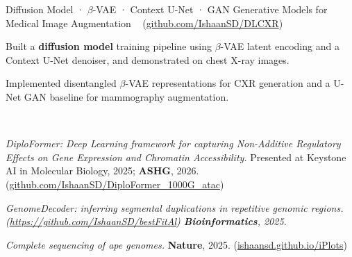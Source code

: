 \documentclass[11pt, a4paper]{awesome-cv}
\begin{document}
\begin{cventries}
  \cventry
    {Diffusion Model · $\beta$-VAE · Context U-Net · GAN}
    {Generative Models for Medical Image Augmentation}
    {~}
    {(\href{https://github.com/IshaanSD/DLCXR}{github.com/IshaanSD/DLCXR})}
    {
        \begin{cvitems}
            \item {Built a \textbf{diffusion model} training pipeline using $\beta$-VAE latent encoding and a Context U-Net denoiser, and demonstrated on chest X-ray images.}
            \item {Implemented disentangled $\beta$-VAE representations for CXR generation and a U-Net GAN baseline for mammography augmentation.}
        \end{cvitems}
    }
\end{cventries}

\begin{cventries}
\cventry
{~}{~}{~}{~}
{
\begin{cvitems}
\item {\textit{DiploFormer: Deep Learning framework for capturing Non-Additive Regulatory Effects on Gene Expression and Chromatin Accessibility.} Presented at Keystone AI in Molecular Biology, 2025; \textbf{ASHG}, 2026. (\href{https://github.com/IshaanSD/DiploFormer_1000G_atac}{github.com/IshaanSD/DiploFormer\_1000G\_atac})}
\item {\textit{GenomeDecoder: inferring segmental duplications in repetitive genomic regions. (\href{https://ishaansd.github.io/iPlots}{https://github.com/IshaanSD/bestFitAl})
\textbf{Bioinformatics}, 2025.}}
\item {\textit{Complete sequencing of ape genomes.} \textbf{Nature}, 2025. (\href{https://ishaansd.github.io/iPlots}{ishaansd.github.io/iPlots})}
\end{cvitems}
}
\end{cventries}
\end{document}
